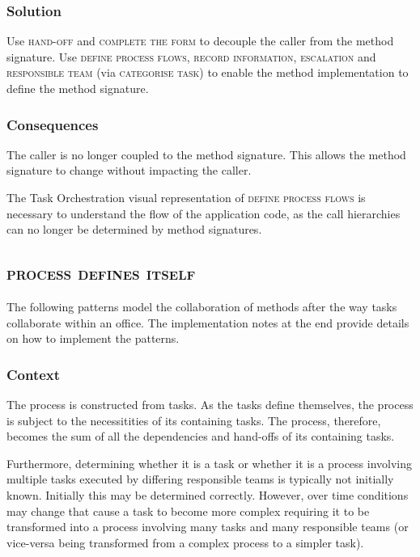 \documentclass[prodmode]{style/acmlarge}
\begin{document}
\subsubsection*{Solution} Use \textsc{hand-off} and \textsc{complete the form}
to decouple the caller from the method signature.  Use \textsc{define
process flows}, \textsc{record information}, \textsc{escalation} and
\textsc{responsible team} (via \textsc{categorise task}) to enable the method
implementation to define the method signature.

\subsubsection*{Consequences} The caller is no longer coupled to the method
signature.  This allows the method signature to change without impacting the
caller.

The Task Orchestration visual representation of \textsc{define process flows} is
necessary to understand the flow of the application code, as the call
hierarchies can no longer be determined by method signatures.



\subsection{\textsc{\textbf{process defines itself}}}

The following patterns model the collaboration of methods after the way tasks
collaborate within an office.  The implementation notes at the end provide
details on how to implement the patterns.

\subsubsection*{Context} The process is constructed from tasks.  As the tasks
define themselves, the process is subject to the necessitities of its containing
tasks.  The process, therefore, becomes the sum of all the dependencies and
hand-offs of its containing tasks.

Furthermore, determining whether it is a task or whether it is a process involving
multiple tasks executed by differing responsible teams is typically not
initially known.  Initially this may be determined correctly.  However, over
time conditions may change that cause a task to become more complex requiring
it to be transformed into a process involving many tasks and many responsible
teams (or vice-versa being transformed from a complex process to a simpler task).
\end{document}
